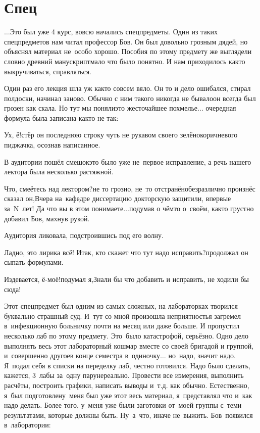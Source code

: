 \newpage
\section*{Спец}

$\ldots$Это был уже 4 курс, вовсю начались спецпредметы. Один из таких спецпредметов нам читал профессор Б\sdash ов. Он был довольно грозным дядей, но объяснял материал не~особо хорошо. Пособия по этому предмету же выглядели словно древний манускрипт\mdash мало что было понятно. И нам приходилось как\sdash то выкручиваться, справляться. 

Один раз его лекция шла уж как\sdash то совсем вяло. Он то и дело ошибался, стирал пол\sdash доски, начинал заново. Обычно с ним такого никогда не бывало\mdash он всегда был грозен как скала. Но тут мы поняли\mdash это жесточайшее похмелье$\ldots$ очередная формула была записана как\sdash то не так:

\diagdash Ух, ё!\mdash стёр он последнюю строку чуть не рукавом своего зелёно\sdash коричневого пиджачка, осознав написанное.

В аудитории пошёл смешок\mdash это было уже не~первое исправление, а речь нашего лектора была несколько растяжной.

\diagdash Что, смеётесь над лектором?\mdash не то грозно, не~то отстранёно\sdash безразлично произнёс сказал он,\mdash Вчера на~кафедре диссертацию докторскую защитили, впервые за~N~лет! Да что вы в этом понимаете$\ldots$\mdash подумав о чём\sdash то о~своём, как\sdash то грустно добавил Б\sdash ов, махнув рукой.

Аудитория ликовала, подстроившись под его волну.

\diagdash Ладно, это лирика всё! Итак, кто скажет что тут надо исправить?\mdash продолжал он сыпать формулами.

\diagdash Издевается, ё-моё!\mdash подумал я,\mdash Знали бы что добавить и исправить, не ходили бы сюда!

Этот спецпредмет был одним из самых сложных, на лабораторках творился буквально страшный суд. И~тут со мной произошла неприятность\mdash я загремел в~инфекционную больничку почти на месяц или даже больше. И пропустил несколько лаб по этому предмету. Это~было катастрофой, серьёзно. Одно дело выполнять весь этот лабораторный кошмар вместе со своей бригадой и группой, и~совершенно другое\mdash в конце семестра в~одиночку$\ldots$ но~надо, значит надо. Я~подал себя в списки на переделку лаб, честно готовился. Надо было сделать, кажется, 3~лабы за~одну пару\mdash нереально. Провести все измерения, выполнить расчёты, построить графики, написать выводы и~т.д. как обычно. Естественно, я~был подготовлен\mdash у~меня был уже этот весь материал, я~представлял что и~как надо делать. Более того, у~меня уже были заготовки от~моей группы с~теми результатами, которые должны быть. Ну~а~что, иначе не~выжить. Б\sdash ов~появился в~лаборатории:

